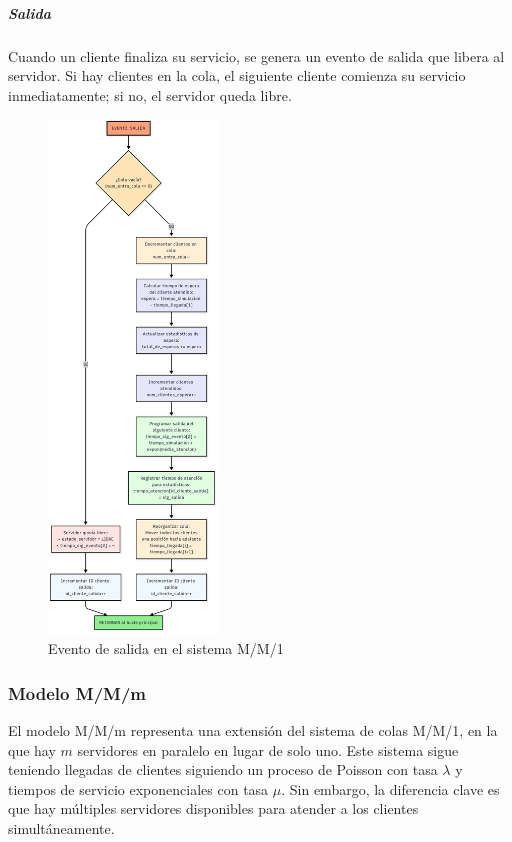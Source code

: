 \documentclass{article}
\begin{document}
\subparagraph{Salida}
Cuando un cliente finaliza su servicio, se genera un evento de salida que libera al servidor. Si hay clientes en la cola, el siguiente cliente comienza su servicio inmediatamente; si no, el servidor queda libre.
\begin{figure}[H]
    \centering
    \includegraphics[width=0.4\textwidth]{images/flujos/MM1Salida.png}
    \caption{Evento de salida en el sistema M/M/1}
    \label{fig:mm1_salida}
\end{figure}

\subsubsection{Modelo M/M/m}

El modelo M/M/m representa una extensión del sistema de colas M/M/1, en la que hay $m$ servidores en paralelo en lugar de solo uno. Este sistema sigue teniendo llegadas de clientes siguiendo un proceso de Poisson con tasa $\lambda$ y tiempos de servicio exponenciales con tasa $\mu$. Sin embargo, la diferencia clave es que hay múltiples servidores disponibles para atender a los clientes simultáneamente.
\end{document}
